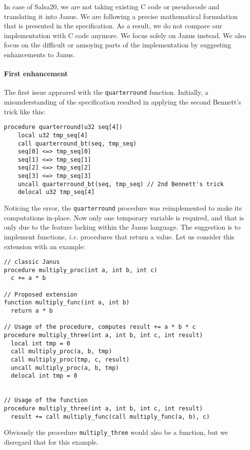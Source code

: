\documentclass[a4paper,10pt,openright]{memoir}
\newcommand{\ie}{\emph{i.e.}\xspace}
\newcommand{\code}[1]{\texttt{#1}}
\begin{document}
In case of Salsa20, we are not taking existing C code or pseudocode and 
translating it into Janus. We are following a precise mathematical 
formulation that is presented in the specification\cite{salsa}. As a 
result, we do not compare our implementation with C code anymore. We 
focus solely on Janus instead. We also focus on the difficult or 
annoying parts of the implementation by suggesting enhancements to 
Janus.

\paragraph{First enhancement}

The first issue appeared with the \code{quarterround} function. Initially, a 
misunderstanding of the specification resulted in applying the second 
Bennett's trick like this:

\begin{lstlisting}[language=Janus]
procedure quarterround(u32 seq[4])
	local u32 tmp_seq[4]
	call quarterround_bt(seq, tmp_seq)
	seq[0] <=> tmp_seq[0]
	seq[1] <=> tmp_seq[1]
	seq[2] <=> tmp_seq[2]
	seq[3] <=> tmp_seq[3]
	uncall quarterround_bt(seq, tmp_seq) // 2nd Bennett's trick
	delocal u32 tmp_seq[4]
\end{lstlisting}

Noticing the error, the \code{quarterround} procedure was reimplemented 
to make its computations in-place. Now only one temporary variable is 
required, and that is only due to the feature lacking within the Janus 
language. The suggestion is to implement functions, \ie procedures that 
return a value. Let us consider this extension with an example:

\begin{lstlisting}[language=Janus]
// classic Janus
procedure multiply_proc(int a, int b, int c)
  c += a * b

// Proposed extension
function multiply_func(int a, int b)
  return a * b

// Usage of the procedure, computes result += a * b * c
procedure multiply_three(int a, int b, int c, int result)
  local int tmp = 0
  call multiply_proc(a, b, tmp)
  call multiply_proc(tmp, c, result)
  uncall multiply_proc(a, b, tmp)
  delocal int tmp = 0


// Usage of the function
procedure multiply_three(int a, int b, int c, int result)
  result += call multiply_func(call multiply_func(a, b), c)
\end{lstlisting}

Obviously the procedure \code{multiply\_three} would also be a function, 
but we disregard that for this example.
\end{document}

